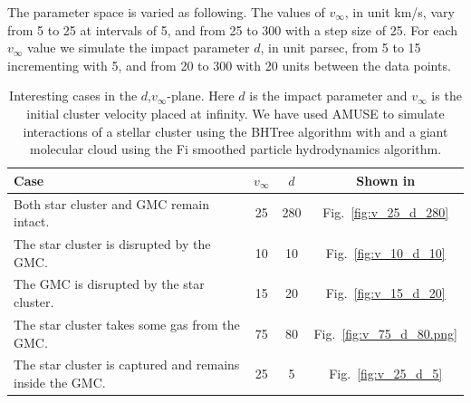 \documentclass{aa}
\begin{document}
The parameter space is varied as following. The values of $v_\infty$, in unit km/s, vary from 5 to 25 at intervals of 5, and from 25 to 300 with a step size of 25. For each $v_\infty$ value we simulate the impact parameter $d$, in unit parsec, from 5 to 15 incrementing with 5, and from 20 to 300 with 20 units between the data points.


\begin{table}
    \caption{Interesting cases in the $d$,$v_\infty$-plane. Here $d$ is the impact parameter and $v_\infty$ is the initial cluster velocity placed at infinity. We have used AMUSE to simulate interactions of a stellar cluster using the BHTree algorithm with and a giant molecular cloud using the Fi smoothed particle hydrodynamics algorithm.}
    \label{tab:cases}
    \centering
    \begin{tabular}{l c c c}
        \hline\hline
        Case & $v_\infty$ & $d$ & Shown in \\
        \hline
        Both star cluster and GMC remain intact. & 25 & 280 & Fig.~\ref{fig:v_25_d_280} \\
        The star cluster is disrupted by the GMC. & 10 & 10 & Fig.~\ref{fig:v_10_d_10} \\
        The GMC is disrupted by the star cluster. & 15 & 20 & Fig.~\ref{fig:v_15_d_20} \\
        The star cluster takes some gas from the GMC. & 75 & 80 & Fig.~\ref{fig:v_75_d_80.png} \\
        The star cluster is captured and remains inside the GMC. & 25 & 5 & Fig.~\ref{fig:v_25_d_5} \\
        \hline
    \end{tabular}
\end{table}
\end{document}
